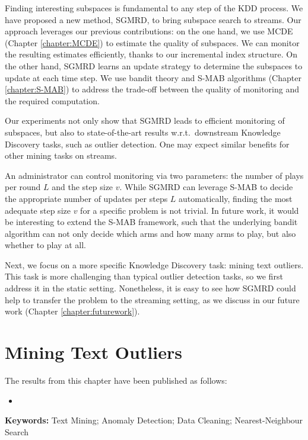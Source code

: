 Finding interesting subspaces is fundamental to any step of the \gls{KDD} process. We have proposed a new method, \gls{SGMRD}, to bring subspace search to streams. Our approach leverages our previous contributions: on the one hand, we use \gls{MCDE} (Chapter \ref{chapter:MCDE}) to estimate the quality of subspaces. We can monitor the resulting estimates efficiently, thanks to our incremental index structure. On the other hand, \gls{SGMRD} learns an update strategy to determine the subspaces to update at each time step. We use bandit theory and \gls{S-MAB} algorithms (Chapter \ref{chapter:S-MAB}) to address the trade-off between the quality of monitoring and the required computation. 

Our experiments not only show that \gls{SGMRD} leads to efficient monitoring of subspaces, but also to state-of-the-art results w.r.t.\ downstream Knowledge Discovery tasks, such as outlier detection. One may expect similar benefits for other mining tasks on streams. 

An administrator can control monitoring via two parameters: the number of plays per round $L$ and the step size $v$. While \gls{SGMRD} can leverage \gls{S-MAB} to decide the appropriate number of updates per steps $L$ automatically, finding the most adequate step size $v$ for a specific problem is not trivial. 
In future work, it would be interesting to extend the \gls{S-MAB} framework, such that the underlying bandit algorithm can not only decide which arms and how many arms to play, but also whether to play at all.  

Next, we focus on a more specific Knowledge Discovery task: mining text outliers. This task is more challenging than typical outlier detection tasks, so we first address it in the static setting. Nonetheless, it is easy to see how \gls{SGMRD} could help to transfer the problem to the streaming setting, as we discuss in our future work (Chapter \ref{chapter:futurework}). 

\chapter{Mining Text Outliers} 
\glsresetall
\label{chapter:textoutlier}

The results from this chapter have been published as follows: 
\begin{itemize}[noitemsep]
	\item {}
\end{itemize}
\textbf{Keywords:} Text Mining; Anomaly Detection; Data Cleaning; Nearest-Neighbour Search

